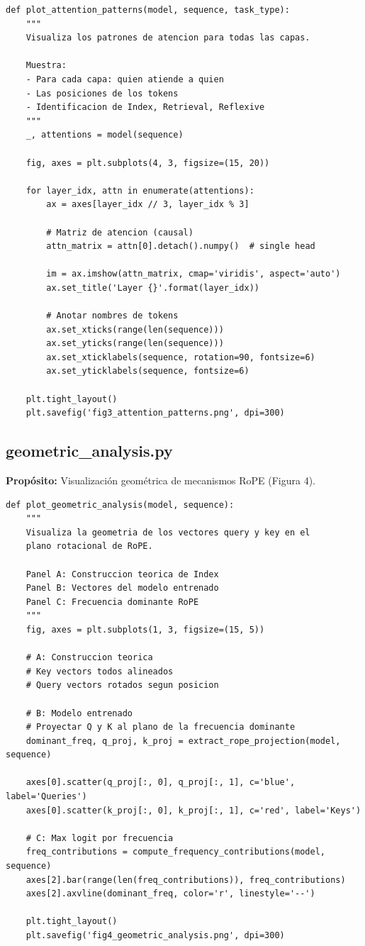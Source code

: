 \documentclass[12pt,a4paper]{report}
\begin{document}
\begin{lstlisting}
def plot_attention_patterns(model, sequence, task_type):
    """
    Visualiza los patrones de atencion para todas las capas.
    
    Muestra:
    - Para cada capa: quien atiende a quien
    - Las posiciones de los tokens
    - Identificacion de Index, Retrieval, Reflexive
    """
    _, attentions = model(sequence)
    
    fig, axes = plt.subplots(4, 3, figsize=(15, 20))
    
    for layer_idx, attn in enumerate(attentions):
        ax = axes[layer_idx // 3, layer_idx % 3]
        
        # Matriz de atencion (causal)
        attn_matrix = attn[0].detach().numpy()  # single head
        
        im = ax.imshow(attn_matrix, cmap='viridis', aspect='auto')
        ax.set_title('Layer {}'.format(layer_idx))
        
        # Anotar nombres de tokens
        ax.set_xticks(range(len(sequence)))
        ax.set_yticks(range(len(sequence)))
        ax.set_xticklabels(sequence, rotation=90, fontsize=6)
        ax.set_yticklabels(sequence, fontsize=6)
    
    plt.tight_layout()
    plt.savefig('fig3_attention_patterns.png', dpi=300)
\end{lstlisting}

\subsection{geometric\_analysis.py}
\label{subsec:geometric_analysis}

\textbf{Propósito:} Visualización geométrica de mecanismos RoPE (Figura 4).

\begin{lstlisting}
def plot_geometric_analysis(model, sequence):
    """
    Visualiza la geometria de los vectores query y key en el
    plano rotacional de RoPE.
    
    Panel A: Construccion teorica de Index
    Panel B: Vectores del modelo entrenado
    Panel C: Frecuencia dominante RoPE
    """
    fig, axes = plt.subplots(1, 3, figsize=(15, 5))
    
    # A: Construccion teorica
    # Key vectors todos alineados
    # Query vectors rotados segun posicion
    
    # B: Modelo entrenado
    # Proyectar Q y K al plano de la frecuencia dominante
    dominant_freq, q_proj, k_proj = extract_rope_projection(model, sequence)
    
    axes[0].scatter(q_proj[:, 0], q_proj[:, 1], c='blue', label='Queries')
    axes[0].scatter(k_proj[:, 0], k_proj[:, 1], c='red', label='Keys')
    
    # C: Max logit por frecuencia
    freq_contributions = compute_frequency_contributions(model, sequence)
    axes[2].bar(range(len(freq_contributions)), freq_contributions)
    axes[2].axvline(dominant_freq, color='r', linestyle='--')
    
    plt.tight_layout()
    plt.savefig('fig4_geometric_analysis.png', dpi=300)
\end{lstlisting}
\end{document}
